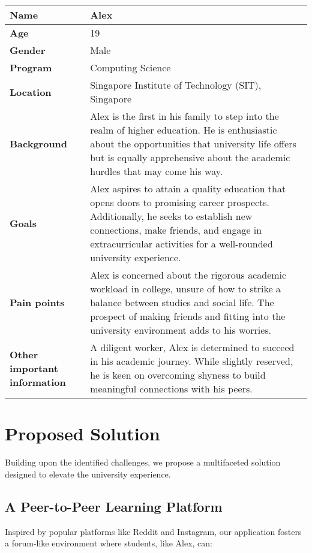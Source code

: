 \begin{center}
\begin{longtable}{|l|p{10cm}|}
\hline
\textbf{Name} & Alex \\
\hline
\textbf{Age} & 19 \\
\hline
\textbf{Gender} & Male \\
\hline
\textbf{Program} & Computing Science \\
\hline
\textbf{Location} & Singapore Institute of Technology (SIT), Singapore\\
\hline
\textbf{Background} & Alex is the first in his family to step into the realm of higher education. He is enthusiastic about the opportunities that university life offers but is equally apprehensive about the academic hurdles that may come his way. \\
\hline
\textbf{Goals} & Alex aspires to attain a quality education that opens doors to promising career prospects. Additionally, he seeks to establish new connections, make friends, and engage in extracurricular activities for a well-rounded university experience. \\
\hline
\textbf{Pain points} & Alex is concerned about the rigorous academic workload in college, unsure of how to strike a balance between studies and social life. The prospect of making friends and fitting into the university environment adds to his worries. \\
\hline
\textbf{Other important information} & A diligent worker, Alex is determined to succeed in his academic journey. While slightly reserved, he is keen on overcoming shyness to build meaningful connections with his peers. \\
\hline
\end{longtable}
\end{center}


\section{Proposed Solution}
\label{proposed_solution}

Building upon the identified challenges, we propose a multifaceted solution designed to elevate the university experience.

\subsection{A Peer-to-Peer Learning Platform}

Inspired by popular platforms like Reddit and Instagram, our application fosters a forum-like environment where students, like Alex, can:

